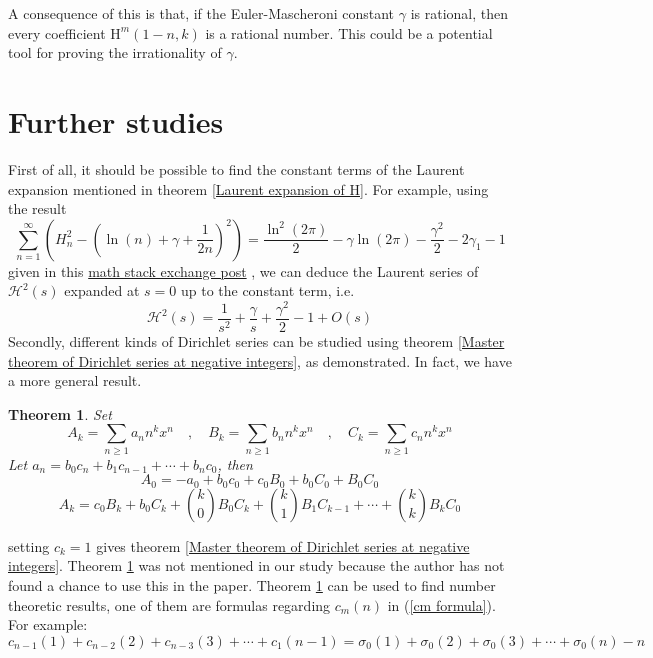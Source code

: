 \documentclass{article}
\newtheorem{theorem}{Theorem}
\begin{document}
A consequence of this is that, if the Euler-Mascheroni constant $\gamma$ is rational, then every coefficient $\text{H}^m(1-n,k)$ is a rational number. This could be a potential tool for proving the irrationality of $\gamma$.


\section{Further studies}First of all, it should be possible to find the constant terms of the Laurent expansion mentioned in theorem \ref{Laurent expansion of H}. For example, using the result \begin{equation}
    \sum_{n=1}^{\infty}\left(H_n^2-\left(\ln(n)+\gamma+\frac{1}{2n}\right)^2\right)=\frac{\ln^2(2\pi)}{2}-\gamma\ln(2\pi)-\frac{\gamma^2}{2}-2\gamma_1-1
\end{equation} given in this 
 \href{https://math.stackexchange.com/questions/2399259/a-closed-form-of-sum-n-1-infty-left-h-n2-left-ln-n-gamma-frac12n-r?rq=1}{math stack exchange post} \cite{2399259}, we can deduce the Laurent series of $\mathcal{H}^2(s)$ expanded at $s=0$ up to the constant term, i.e. \begin{equation}
     \mathcal{H}^2(s)=\frac{1}{s^2}+\frac{\gamma}{s}+\frac{\gamma^2}{2}-1+O(s)
 \end{equation} Secondly, different kinds of Dirichlet series can be studied using theorem \ref{Master theorem of Dirichlet series at negative integers}, as demonstrated. In fact, we have a more general result.
\begin{theorem} \label{Cauchy relation of Dirichlet series at negative integers} Set
$$A_k=\sum_{n\geq 1} a_n n^k x^n\quad ,\quad B_k=\sum_{n\geq 1} b_n n^k x^n\quad ,\quad C_k=\sum_{n\geq 1} c_n n^k x^n $$
Let $a_n=b_0c_n+b_1c_{n-1}+\cdots+b_n c_0$, then $$A_0=-a_0+b_0c_0+c_0B_0+b_0C_0+B_0C_0$$
$$A_k=c_0B_k+b_0C_k+\binom{k}{0}B_0C_k+\binom{k}{1}B_1C_{k-1}+\cdots+\binom{k}{k}B_kC_0$$
\end{theorem}
setting $c_k=1$ gives theorem \ref{Master theorem of Dirichlet series at negative integers}. Theorem \ref{Cauchy relation of Dirichlet series at negative integers} was not mentioned in our study because the author has not found a chance to use this in the paper. Theorem \ref{Cauchy relation of Dirichlet series at negative integers} can be used to find number theoretic results, one of them are formulas regarding $c_m(n)$ in (\ref{cm formula}). For example: 
$$c_{n-1}(1)+c_{n-2}(2)+c_{n-3}(3)+\cdots+c_1(n-1)=\sigma_0(1)+\sigma_0(2)+\sigma_0(3)+\cdots+\sigma_0(n)-n$$
\end{document}
